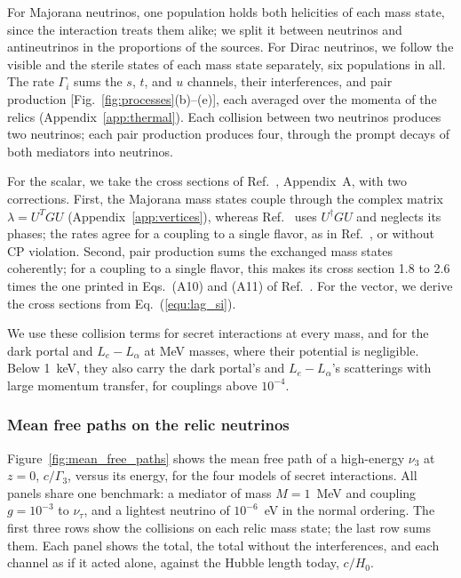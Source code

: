 \documentclass[linenumbers, aps, prd, twocolumn, superscriptaddress, floatfix, longbibliography, nofootinbib, bibnotes]{revtex4-2}
\begin{document}
For Majorana neutrinos, one population holds both helicities of each mass state, since the interaction treats them alike; we split it between neutrinos and antineutrinos in the proportions of the sources.
For Dirac neutrinos, we follow the visible and the sterile states of each mass state separately, six populations in all.
The rate $\Gamma_i$ sums the $s$, $t$, and $u$ channels, their interferences, and pair production [Fig.~\ref{fig:processes}(b)--(e)], each averaged over the momenta of the relics (Appendix~\ref{app:thermal}).
Each collision between two neutrinos produces two neutrinos; each pair production produces four, through the prompt decays of both mediators into neutrinos.

For the scalar, we take the cross sections of Ref.~\cite{Esteban:2021tub}, Appendix~A, with two corrections.
First, the Majorana mass states couple through the complex matrix $\lambda = U^T G U$ (Appendix~\ref{app:vertices}), whereas Ref.~\cite{Esteban:2021tub} uses $U^\dagger G U$ and neglects its phases; the rates agree for a coupling to a single flavor, as in Ref.~\cite{Esteban:2021tub}, or without CP violation.
Second, pair production sums the exchanged mass states coherently; for a coupling to a single flavor, this makes its cross section 1.8 to 2.6 times the one printed in Eqs.~(A10) and (A11) of Ref.~\cite{Esteban:2021tub}.
For the vector, we derive the cross sections from Eq.~(\ref{equ:lag_si}).

We use these collision terms for secret interactions at every mass, and for the dark portal and $L_e - L_\alpha$ at MeV masses, where their potential is negligible.
Below 1~keV, they also carry the dark portal's and $L_e - L_\alpha$'s scatterings with large momentum transfer, for couplings above $10^{-4}$.

\subsubsection{Mean free paths on the relic neutrinos}
Figure~\ref{fig:mean_free_paths} shows the mean free path of a high-energy $\nu_3$ at $z = 0$, $c/\Gamma_3$, versus its energy, for the four models of secret interactions.
All panels share one benchmark: a mediator of mass $M = 1$~MeV and coupling $g = 10^{-3}$ to $\nu_\tau$, and a lightest neutrino of $10^{-6}$~eV in the normal ordering.
The first three rows show the collisions on each relic mass state; the last row sums them.
Each panel shows the total, the total without the interferences, and each channel as if it acted alone, against the Hubble length today, $c/H_0$.
\end{document}
